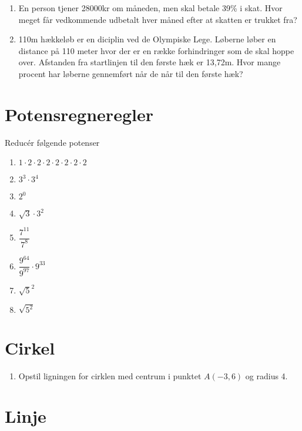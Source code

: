 \documentclass[11pt,a5paper,fleqn,leqno]{book}
\begin{document}
\begin{enumerate}
\item \label{op:procent_1} En person tjener 28000kr om måneden, men skal betale 39\% i skat. Hvor meget får vedkommende udbetalt hver måned efter at skatten er trukket fra?
\item \label{op:procent_2} 110m hækkeløb er en diciplin ved de Olympiske Lege. Løberne løber en distance på 110 meter hvor der er en række forhindringer som de skal hoppe over. Afstanden fra startlinjen til den første hæk er 13,72m. Hvor mange procent har løberne gennemført når de når til den første hæk?
\end{enumerate}

\section{Potensregneregler}

Reducér følgende potenser

\begin{enumerate}
\item \label{op:potens_1} $1 \cdot 2 \cdot 2 \cdot 2 \cdot 2 \cdot 2 \cdot 2 \cdot 2$
\item \label{op:potens_2} $3^3 \cdot 3^4$
\item \label{op:potens_3} $2^0$
\item \label{op:potens_4} $\sqrt{3} \cdot 3^2$
\item \label{op:potens_5} $\dfrac{7^{11}}{7^8}$
\item \label{op:potens_6} $\dfrac{9^{64}}{9^{97}} \cdot 9^{33}$
\item \label{op:potens_7} $\sqrt{5}^2$
\item \label{op:potens_8} $\sqrt{5^2}$
\end{enumerate}

\section{Cirkel}

\begin{enumerate}
\item \label{op:cirkel_1} Opstil ligningen for cirklen med centrum i punktet $A(-3,6)$ og radius 4.
\end{enumerate}

\section{Linje}
\end{document}
